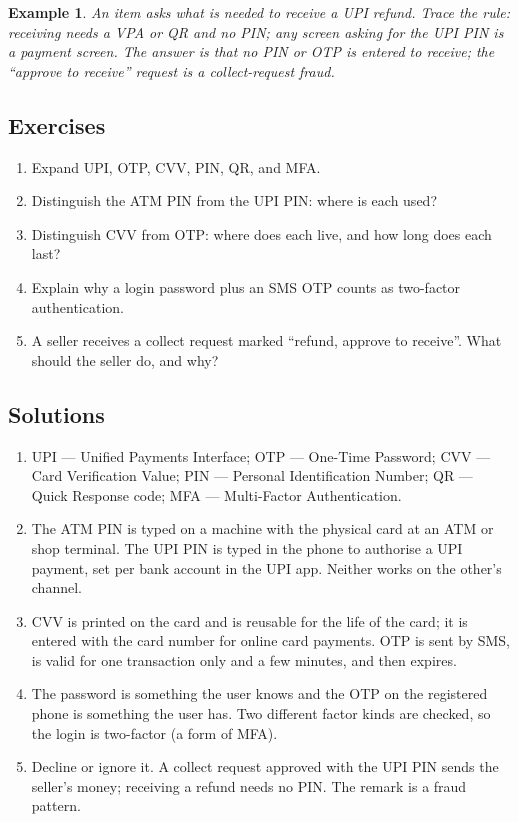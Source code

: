 \documentclass[11pt]{article}
\newtheorem{example}{Example}[section]
\begin{document}
\begin{example}
An item asks what is needed to receive a UPI refund. Trace the rule:
receiving needs a VPA or QR and no PIN; any screen asking for the UPI PIN is
a payment screen. The answer is that no PIN or OTP is entered to receive;
the ``approve to receive'' request is a collect-request fraud.
\end{example}

\subsection*{Exercises}
\begin{enumerate}[label=\arabic*.]
  \item Expand UPI, OTP, CVV, PIN, QR, and MFA.
  \item Distinguish the ATM PIN from the UPI PIN: where is each used?
  \item Distinguish CVV from OTP: where does each live, and how long does
    each last?
  \item Explain why a login password plus an SMS OTP counts as two-factor
    authentication.
  \item A seller receives a collect request marked ``refund, approve to
    receive''. What should the seller do, and why?
\end{enumerate}

\subsection*{Solutions}
\begingroup\small
\begin{enumerate}[label=\arabic*.]
  \item UPI --- Unified Payments Interface; OTP --- One-Time Password; CVV
    --- Card Verification Value; PIN --- Personal Identification Number; QR
    --- Quick Response code; MFA --- Multi-Factor Authentication.
  \item The ATM PIN is typed on a machine with the physical card at an ATM
    or shop terminal. The UPI PIN is typed in the phone to authorise a UPI
    payment, set per bank account in the UPI app. Neither works on the
    other's channel.
  \item CVV is printed on the card and is reusable for the life of the card;
    it is entered with the card number for online card payments. OTP is sent
    by SMS, is valid for one transaction only and a few minutes, and then
    expires.
  \item The password is something the user knows and the OTP on the
    registered phone is something the user has. Two different factor kinds
    are checked, so the login is two-factor (a form of MFA).
  \item Decline or ignore it. A collect request approved with the UPI PIN
    sends the seller's money; receiving a refund needs no PIN. The remark is
    a fraud pattern.
\end{enumerate}
\endgroup
\end{document}
